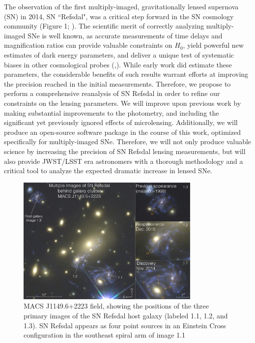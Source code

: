 The observation of the first multiply-imaged, gravitationally lensed supernova (SN) in 2014, SN ``Refsdal", 
was a critical step forward in the SN cosmology community (Figure 1; \citet{Kelly:2015a}). The scientific
merit of correctly analyzing multiply-imaged SNe is well known, as accurate measurements of time delays and magnification ratios
can provide valuable constraints on $H_0$, yield powerful new estimates of dark energy parameters, and deliver a unique test of 
systematic biases in other cosmological probes (\citet{Jha:2007},\citet{Treu:2013}). While early work did estimate these parameters, 
the considerable benefits of such results warrant efforts at improving the precision reached in the initial measurements. Therefore, 
we propose to perform a comprehensive reanalysis of SN Refsdal in order to refine our constraints on the lensing parameters. 
We will improve upon previous work by making substantial improvements to the photometry, and including 
the significant yet previously ignored effects of microlensing. Additionally, we will produce an open-source software 
package in the course of this work, optimized specifically for multiply-imaged SNe. Therefore, we will not only produce 
valuable science by increasing the precision of SN Refsdal lensing measurements, but will also provide JWST/LSST era astronomers 
with a thorough methodology and a critical tool to analyze the expected dramatic increase in lensed SNe.


\begin{figure}[h]
\centering
\includegraphics[width=0.8\textwidth]{FIG/refsdal_rodney.pdf}
\caption{
MACS J1149.6+2223 field, showing the positions of the three primary
images of the SN Refsdal host galaxy (labeled 1.1, 1.2, and 1.3). SN
Refsdal appears as four point sources in an Einstein Cross
configuration in the southeast spiral arm of image 1.1 \citep{Rodney:2016}}
\end{figure}

